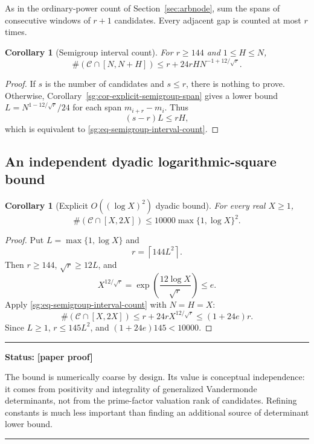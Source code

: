 \documentclass[11pt,oneside]{article}
\newtheorem{corollary}[theorem]{Corollary}
\theoremstyle{definition}
\theoremstyle{remark}
\newcommand{\Cand}{\mathcal C}
\newcommand{\statusnew}{\textcolor{newgreen}{\textbf{[paper proof]}}}
\newenvironment{statusbox}[1]
{\begin{center}\begin{minipage}{0.94\textwidth}\raggedright\hbadness=10000\hrule
\vspace{0.45em}\textbf{Status:} #1\par\vspace{0.35em}}
{\vspace{0.35em}\hrule\end{minipage}\end{center}}
\begin{document}
As in the ordinary-power count of Section~\ref{sec:arbnode}, sum the spans of consecutive
windows of $r+1$ candidates.  Every adjacent gap is counted at most $r$ times.

\begin{corollary}[Semigroup interval count]
\label{sg:cor-semigroup-interval-count}
For $r\ge144$ and $1\le H\le N$,
\begin{equation}
 \#(\Cand\cap[N,N+H])
 \le r+24rH N^{-1+12/\sqrt r}.
 \label{sg:eq-semigroup-interval-count}
\end{equation}
\end{corollary}

\begin{proof}
If $s$ is the number of candidates and $s\le r$, there is nothing to prove.  Otherwise,
Corollary~\ref{sg:cor-explicit-semigroup-span} gives a lower bound
$L=N^{1-12/\sqrt r}/24$ for each span $m_{i+r}-m_i$.  Thus
\[
 (s-r)L\le rH,
\]
which is equivalent to \eqref{sg:eq-semigroup-interval-count}.
\end{proof}

\subsection{An independent dyadic logarithmic-square bound}

\begin{corollary}[Explicit $O((\log X)^2)$ dyadic bound]
\label{sg:cor-semigroup-log-square}
For every real $X\ge1$,
\begin{equation}
 \#(\Cand\cap[X,2X])
 \le10000\max\{1,\log X\}^2.
 \label{sg:eq-semigroup-log-square}
\end{equation}
\end{corollary}

\begin{proof}
Put $L=\max\{1,\log X\}$ and
\[
 r=\left\lceil144L^2\right\rceil.
\]
Then $r\ge144$, $\sqrt r\ge12L$, and
\[
 X^{12/\sqrt r}
 =\exp\!\left(\frac{12\log X}{\sqrt r}\right)
 \le e.
\]
Apply \eqref{sg:eq-semigroup-interval-count} with $N=H=X$:
\[
 \#(\Cand\cap[X,2X])
 \le r+24rX^{12/\sqrt r}
 \le(1+24e)r.
\]
Since $L\ge1$, $r\le145L^2$, and
$(1+24e)145<10000$.
\end{proof}

\begin{statusbox}{\statusnew}
The bound is numerically coarse by design.  Its value is conceptual independence: it comes
from positivity and integrality of generalized Vandermonde determinants, not from the
prime-factor valuation rank of candidates.  Refining constants is much less important than
finding an additional source of determinant lower bound.
\end{statusbox}
\end{document}
